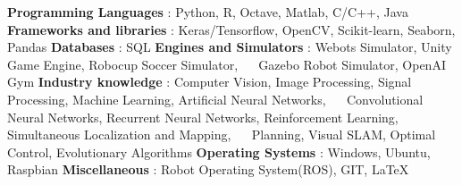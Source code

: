 \begin{cventries}  
\skillentry
    {
    \bullet \space \textbf{Programming Languages} : Python, R, Octave, Matlab, C/C++, Java \newline
    \bullet \space \textbf{Frameworks and libraries} : Keras/Tensorflow, OpenCV, Scikit-learn, Seaborn, Pandas   \newline
    \bullet \space \textbf{Databases} : SQL \newline
    \bullet \space \textbf{Engines and Simulators} : Webots Simulator, Unity Game Engine, Robocup Soccer Simulator, \newline $\quad$ Gazebo Robot Simulator, OpenAI Gym \newline
    \bullet \space \textbf{Industry knowledge} : Computer Vision, Image Processing, Signal Processing, Machine Learning, Artificial Neural Networks, \newline $\quad$ Convolutional Neural Networks, Recurrent Neural Networks, Reinforcement Learning, Simultaneous Localization and Mapping, \newline $\quad$ Planning, Visual SLAM, Optimal Control, Evolutionary Algorithms   \newline
    \bullet \space \textbf{Operating Systems} : Windows, Ubuntu, Raspbian \newline
    \bullet \space \textbf{Miscellaneous} : Robot Operating System(ROS), GIT, LaTeX
    }
\end{cventries}
